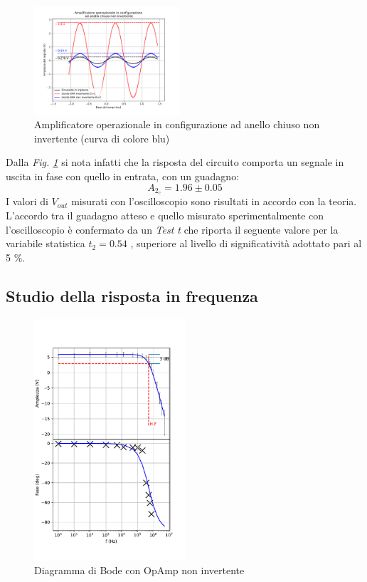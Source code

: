 \documentclass[journal]{IEEEtran}
\begin{document}
\begin{figure}[H]%
\begin {center}
\includegraphics[width=0.48\textwidth]{analysis/output/OPA-closed-loop-non-inv-G2-11.pdf}
\caption{Amplificatore operazionale in configurazione ad anello chiuso non invertente (curva di colore blu)}
\label{fig:g2-11}
\end {center}
\end{figure}

Dalla \textit{Fig. \ref{fig:g2-11}} si nota infatti che la risposta del circuito comporta un segnale in uscita in fase con quello in entrata, con un guadagno:
\[A_{2_c} = 1.96 \pm 0.05\]
I valori di $V_{out}$ misurati con l'oscilloscopio sono risultati in accordo con la teoria.
L'accordo tra il guadagno atteso e quello misurato sperimentalmente con l'oscilloscopio è confermato da un \textit{Test t} che riporta il seguente valore per la variabile statistica $t_2 = 0.54$ , superiore al livello di significatività adottato pari al 5 \%.

\subsection{\textbf{Studio della risposta in frequenza}}

\vspace{-20mm}

\begin{figure}[H]%
\begin {center}
\includegraphics[width=0.50\textwidth]{analysis/output/OPA-bode_gain2(mag+phase).pdf}
\caption{Diagramma di Bode con OpAmp non invertente}
\label{fig:gain2}
\end{center}
\end{figure}
\end{document}
